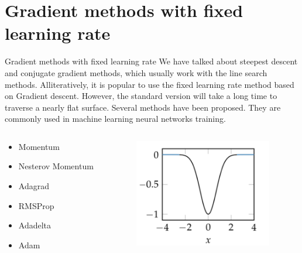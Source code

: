 \documentclass{beamer}
\begin{document}
\section{Gradient methods with fixed learning rate}
\begin{frame}{Gradient methods with fixed learning rate}
We have talked about steepest descent and conjugate gradient methods, which usually work with the line search methods. Alliteratively, it is popular to use the fixed learning rate method based on Gradient descent. However, the standard version will take a long time to traverse a nearly flat surface.
Several methods have been proposed. They are commonly used in machine learning neural networks training.
\begin{columns}
\begin{column}{.4\textwidth}
\begin{itemize}
    \item Momentum
    \item Nesterov Momentum
    \item Adagrad
    \item RMSProp
    \item Adadelta
    \item Adam
\end{itemize}
\end{column}

\begin{column}{.6\textwidth}
\begin{figure}
\centering
\includegraphics[width=60mm]{Figs/flat.jpeg}
\end{figure}
\end{column}
\end{columns}
\end{frame}
\end{document}
